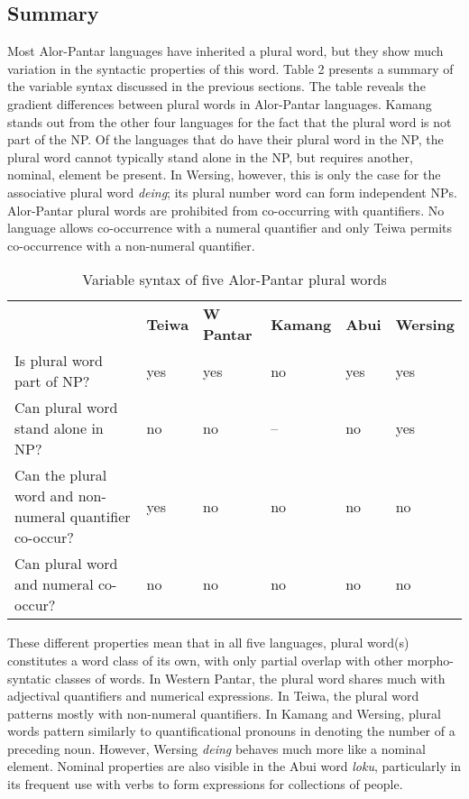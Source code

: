 \subsection{Summary}  %
Most Alor-Pantar languages have inherited a plural word, but they show much variation in the syntactic properties of this word. Table 2 presents a summary of the variable syntax discussed in the previous sections. The table reveals the gradient differences between plural words in Alor-Pantar languages. Kamang stands out from the other four languages for the fact that the plural word is not part of the NP. Of the languages that do have their plural word in the NP, the plural word cannot typically stand alone in the NP, but requires another, nominal, element be present. In Wersing, however, this is only the case for the associative plural word \textit{deing}; its plural number word can form independent NPs. Alor-Pantar plural words are prohibited from co-occurring with quantifiers. No language allows co-occurrence with a numeral quantifier and only Teiwa permits co-occurrence with a non-numeral quantifier.

\begin{table}\centering


\begin{tabular}{p{3cm}lllll}
 &\textbf{Teiwa}  &\textbf{W Pantar} &\textbf{Kamang}  &\textbf{Abui}  &\textbf{Wersing}\\
Is plural word part of NP? &yes &yes &no &yes &yes\\
Can plural word stand alone in NP? &no &no &-- &no &yes\\
Can the plural word and non-numeral quantifier co-occur? &yes &no &no &no &no\\
Can plural word and numeral co-occur? &no &no &no &no &no\\

\end{tabular}
\caption{Variable syntax of five Alor-Pantar plural words}
\end{table}

 These different properties mean that in all five languages, plural word(s) constitutes a word class of its own, with only partial overlap with other morpho-syntatic classes of words. In Western Pantar, the plural word shares much with adjectival quantifiers and numerical expressions. In Teiwa, the plural word patterns mostly with non-numeral quantifiers. In Kamang and Wersing, plural words pattern similarly to quantificational pronouns in denoting the number of a preceding noun. However, Wersing \textit{deing} behaves much more like a nominal element. Nominal properties are also visible in the Abui word \textit{loku}, particularly in its frequent use with verbs to form expressions for collections of people.

